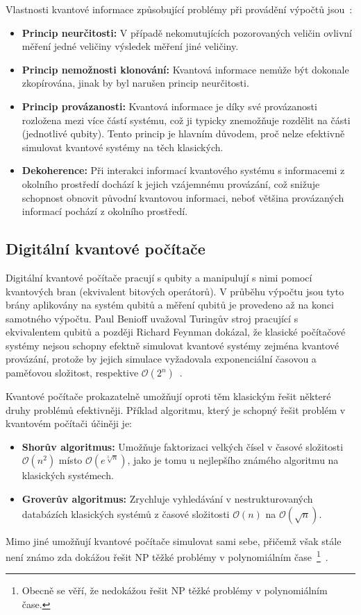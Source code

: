 Vlastnosti kvantové informace způsobující problémy při provádění výpočtů jsou~\cite{NaturalComputing}:
\begin{itemize}
    \item \textbf{Princip neurčitosti:} V případě nekomutujících pozorovaných veličin ovlivní měření jedné veličiny výsledek měření jiné veličiny. 
    \item \textbf{Princip nemožnosti klonování:} Kvantová informace nemůže být dokonale zkopírována, jinak by byl narušen princip neurčitosti. 
    \item \textbf{Princip provázanosti: } Kvantová informace je díky své provázanosti rozložena mezi více částí systému, což ji typicky znemožňuje rozdělit na části (jednotlivé qubity). Tento princip je hlavním důvodem, proč nelze efektivně simulovat kvantové systémy na těch klasických. 
    \item \textbf{Dekoherence: } Při interakci informací kvantového systému s informacemi z okolního prostředí dochází k jejich vzájemnému provázání, což snižuje schopnost obnovit původní kvantovou informaci, neboť většina provázaných informací pochází z okolního prostředí. 
\end{itemize}

\subsection{Digitální kvantové počítače}
Digitální kvantové počítače pracují s qubity a manipulují s nimi pomocí kvantových bran (ekvivalent bitových operátorů).
V průběhu výpočtu jsou tyto brány aplikovány na systém qubitů a měření qubitů je provedeno až na konci samotného výpočtu. 
Paul Benioff uvažoval Turingův stroj pracující s ekvivalentem qubitů a později Richard Feynman dokázal, že klasické počítačové systémy nejsou schopny efektně simulovat kvantové systémy zejména kvantové provázání, protože by jejich simulace vyžadovala exponenciální časovou a paměťovou složitost, respektive $\mathcal{O}\left( 2^n \right)$~\cite{NaturalComputing,QuantumComuting-Introduction}. 

Kvantové počítače prokazatelně umožňují oproti těm klasickým řešit některé druhy problémů efektivněji. 
Příklad algoritmu, který je schopný řešit problém v kvantovém počítači účiněji je: 
\begin{itemize}
    \item \textbf{Shorův algoritmus:} Umožňuje faktorizaci velkých čísel v časové složitosti $\mathcal{O}\left( n^2 \right)$ místo $\mathcal{O}\left(e^{\sqrt[3]{n}} \right)$, jako je tomu u nejlepšího známého algoritmu na klasických systémech.
    \item \textbf{Groverův algoritmus:} Zrychluje vyhledávání v nestrukturovaných databázích klasických systémů z časové složitosti $\mathcal{O}\left( n \right)$ na $\mathcal{O}\left( \sqrt{n} \right)$. 
\end{itemize}
Mimo jiné umožňují kvantové počítače simulovat sami sebe, přičemž však stále není známo zda dokážou řešit NP těžké problémy v polynomiálním čase~\footnote{Obecně se věří, že nedokážou řešit NP těžké problémy v polynomiálním čase.}~\cite{NaturalComputing}. 

